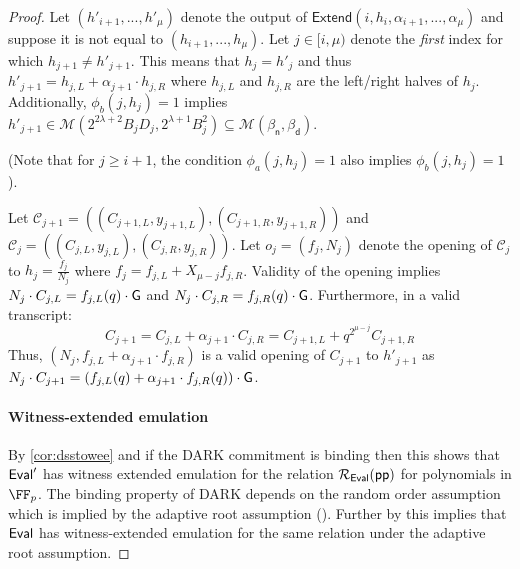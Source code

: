 \begin{proof} 
Let $(h'_{i+1},...,h'_\mu)$ denote the output of $\textsf{Extend}(i, h_i, \alpha_{i+1},...,\alpha_\mu)$ and suppose it is not equal to $(h_{i+1},..., h_\mu)$. Let $j \in [i, \mu)$ denote the \emph{first} index for which $h_{j+1} \neq h'_{j+1}$. This means that $h_j = h'_j$ and thus $h'_{j+1} = h_{j, L} + \alpha_{j+1} \cdot h_{j, R}$ where $h_{j, L}$ and $h_{j, R}$ are the left/right halves of $h_{j}$. Additionally, $\phi_b(j, h_{j}) = 1$ implies $h'_{j+1} \in \mathcal{M}(2^{2\lambda + 2} B_{j}D_j, 2^{\lambda + 1} B_{j}^2) \subseteq \mathcal{M}(\beta_\textsf{n}, \beta_\textsf{d})$. 

(Note that for $j \geq i+1$, the condition $\phi_a(j, h_j) = 1$ also implies $\phi_b(j, h_j) = 1$).

Let $\mathcal{C}_{j+1} = ((C_{j+1, L}, y_{j+1,L}), (C_{j+1,R}, y_{j+1,R}))$ and $\mathcal{C}_{j} = ((C_{j,L}, y_{j,L}), (C_{j,R},y_{j,R}))$. 
Let $o_j = (f_j, N_{j})$ denote the opening of $\mathcal{C}_{j}$ to $h_j =\frac{f_j}{N_{j}}$ where $f_{j} = f_{j, L} + X_{{\mu - j }} f_{j, R}$. Validity of the opening implies $N_{j} \cdot C_{j,L} = f_{j,L}(q) \cdot \gr{G}$ and $N_{j} \cdot C_{j,R} = f_{j,R}(q) \cdot \gr{G}$. Furthermore, in a valid transcript: 
 $$C_{j+1}  = C_{j, L} + \alpha_{j+1} \cdot C_{j,R} =  C_{j+1,L} + q^{2^{\mu - j}} C_{j+1,R}$$
  Thus, $(N_{j}, f_{j,L} + \alpha_{j+1} \cdot f_{j, R})$ is a valid opening of $C_{j+1}$ to $h'_{j+1}$ as $N_{j} \cdot C_{j+1} = (f_{j, L}(q) + \alpha_{j+1} \cdot f_{j, R}(q)) \cdot \gr{G}$. 
  
\paragraph{Witness-extended emulation}
By \cref{cor:dsstowee} and if the DARK commitment is binding then this shows that $\textsf{{Eval}}'$ has witness extended emulation for the relation $\mathcal{R}_{\textsf{{Eval}}}(\textsf{pp})$ for polynomials in $\FF_p$. The binding property of DARK depends on the random order assumption which is implied by the adaptive root assumption (). Further by  this implies that $\textsf{{Eval}}$ has witness-extended emulation for the same relation under the adaptive root assumption.

\end{proof} 









